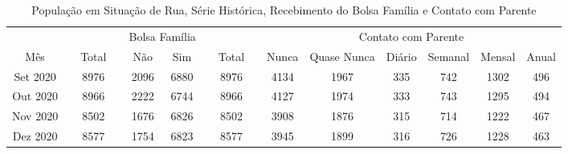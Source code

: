 \documentclass[12pt]{article}
\begin{document}
\begin{landscape}
\pagestyle{empty}
\begin{table}[htbp]
  \centering
  \caption{População em Situação de Rua, Série Histórica, Recebimento do Bolsa Família e Contato com Parente}
  \tabcolsep=0.15cm
	\renewcommand{\arraystretch}{1.0}
	\begin{adjustbox}{max width=\linewidth}
    \begin{tabular}{lllllllllllllll}
         & \textcolor[rgb]{ 1,  1,  1}{} &      & \textcolor[rgb]{ 1,  1,  1}{} & \multicolumn{2}{c}{Bolsa Família} & \textcolor[rgb]{ 1,  1,  1}{} &      & \textcolor[rgb]{ 1,  1,  1}{} & \multicolumn{6}{c}{Contato com Parente} \\
\cmidrule{1-3}\cmidrule{5-6}\cmidrule{8-8}\cmidrule{10-15}    \multicolumn{1}{c}{Mês} &      & \multicolumn{1}{c}{Total} &      & \multicolumn{1}{c}{Não} & \multicolumn{1}{c}{Sim} &      & \multicolumn{1}{c}{Total} &      & \multicolumn{1}{c}{Nunca} & \multicolumn{1}{c}{Quase Nunca} & \multicolumn{1}{c}{Diário} & \multicolumn{1}{c}{Semanal} & \multicolumn{1}{c}{Mensal} & \multicolumn{1}{c}{Anual} \\
\cmidrule{1-3}\cmidrule{5-6}\cmidrule{8-8}\cmidrule{10-15}    \multicolumn{1}{c}{Set 2020} &      & \multicolumn{1}{c}{8976} &      & \multicolumn{1}{c}{2096} & \multicolumn{1}{c}{6880} &      & \multicolumn{1}{c}{8976} &      & \multicolumn{1}{c}{4134} & \multicolumn{1}{c}{1967} & \multicolumn{1}{c}{335} & \multicolumn{1}{c}{742} & \multicolumn{1}{c}{1302} & \multicolumn{1}{c}{496} \\
    \multicolumn{1}{c}{Out 2020} &      & \multicolumn{1}{c}{8966} &      & \multicolumn{1}{c}{2222} & \multicolumn{1}{c}{6744} &      & \multicolumn{1}{c}{8966} &      & \multicolumn{1}{c}{4127} & \multicolumn{1}{c}{1974} & \multicolumn{1}{c}{333} & \multicolumn{1}{c}{743} & \multicolumn{1}{c}{1295} & \multicolumn{1}{c}{494} \\
    \multicolumn{1}{c}{Nov 2020} &      & \multicolumn{1}{c}{8502} &      & \multicolumn{1}{c}{1676} & \multicolumn{1}{c}{6826} &      & \multicolumn{1}{c}{8502} &      & \multicolumn{1}{c}{3908} & \multicolumn{1}{c}{1876} & \multicolumn{1}{c}{315} & \multicolumn{1}{c}{714} & \multicolumn{1}{c}{1222} & \multicolumn{1}{c}{467} \\
    \multicolumn{1}{c}{Dez 2020} &      & \multicolumn{1}{c}{8577} &      & \multicolumn{1}{c}{1754} & \multicolumn{1}{c}{6823} &      & \multicolumn{1}{c}{8577} &      & \multicolumn{1}{c}{3945} & \multicolumn{1}{c}{1899} & \multicolumn{1}{c}{316} & \multicolumn{1}{c}{726} & \multicolumn{1}{c}{1228} & \multicolumn{1}{c}{463} \\

\end{tabular}
\end{adjustbox}
\end{table}
\end{landscape}
\end{document}
